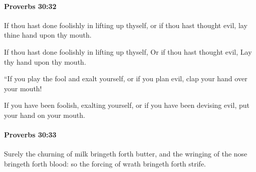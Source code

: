 		\paragraph{Proverbs 30:32} %
			\label{PROVERBS-30-32}

			If thou hast done foolishly in lifting up thyself, or if thou hast thought evil, lay thine hand upon thy mouth.

			\begin{versebox}
					\item[BHS] 
					\item[ASV] If thou hast done foolishly in lifting up thyself, Or if thou hast thought evil, Lay thy hand upon thy mouth.
					\item[NIV] “If you play the fool and exalt yourself, or if you plan evil, clap your hand over your mouth!
					\item[NRSV] If you have been foolish, exalting yourself, or if you have been devising evil, put your hand on your mouth.
			\end{versebox}

		\paragraph{Proverbs 30:33} %
			\label{PROVERBS-30-33}

			Surely the churning of milk bringeth forth butter, and the wringing of the nose bringeth forth blood: so the forcing of wrath bringeth forth strife.

